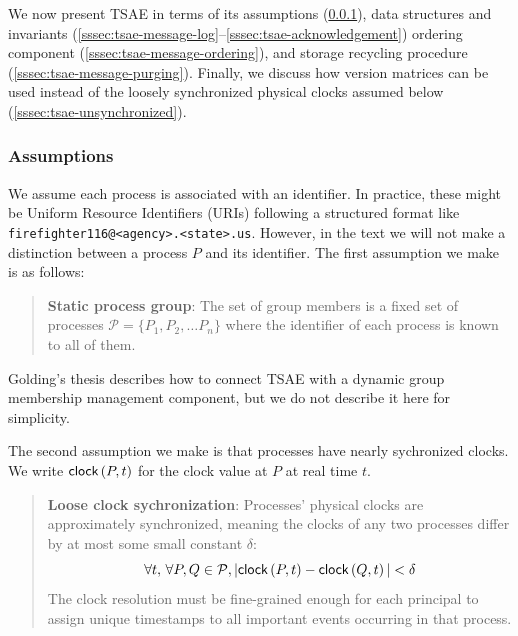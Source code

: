\documentclass[]             %
{NASA}                       %
\theoremstyle{definition}
\begin{document}
We now present TSAE in terms of its assumptions
(\ref{sssec:tsae-assumptions}), data structures and invariants
(\ref{sssec:tsae-message-log}--\ref{sssec:tsae-acknowledgement})
ordering component (\ref{sssec:tsae-message-ordering}), and storage
recycling procedure (\ref{sssec:tsae-message-purging}). Finally, we
discuss how version matrices can be used instead of the loosely
synchronized physical clocks assumed below
(\ref{sssec:tsae-unsynchronized}).

\subsubsection{Assumptions}
\label{sssec:tsae-assumptions}
We assume each process is associated with an identifier. In practice,
these might be Uniform Resource Identifiers (URIs) \cite{rfc3986}
following a structured format like
\texttt{firefighter116@<agency>.<state>.us}. However, in the text we
will not make a distinction between a process $P$ and its
identifier. The first assumption we make is as follows:
\begin{quote}
  \textbf{Static process group}: The set of group members is a fixed
  set of processes $\mathcal{P} = \{P_1, P_2, \ldots P_n\}$ where the
  identifier of each process is known to all of them.
\end{quote}
Golding's thesis describes how to connect TSAE with a dynamic group
membership management component, but we do not describe it here for
simplicity.

The second assumption we make is that processes have nearly
sychronized clocks. We write $\textsf{clock}\left(P, t\right)$ for the clock value at $P$
at real time $t$.
\begin{quote}
  \textbf{Loose clock sychronization}: Processes' physical clocks are approximately
  synchronized, meaning the clocks of any two processes differ by at
  most some small constant $\delta$:
  \[ \forall t,\, \forall P, Q \in \mathcal{P}, |\textsf{clock}\left(P, t\right) - \textsf{clock}\left(Q, t\right)| < \delta
  \]
  The clock resolution must be fine-grained enough for each principal
  to assign unique timestamps to all important events occurring in
  that process.
\end{quote}
\end{document}
